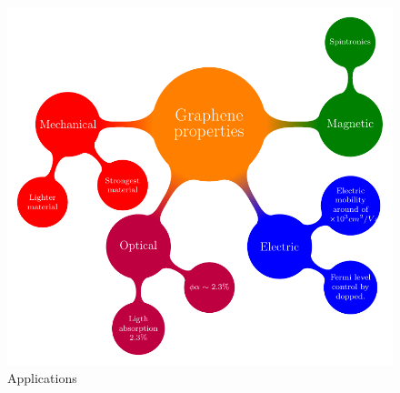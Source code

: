 \begin{figure}[H]
	\centering
	\includegraphics[width=\textwidth]{FIGURES/Physical_Background/image07.pdf}
	\caption{Applications}
	\label{fig:introfig32}
\end{figure}




